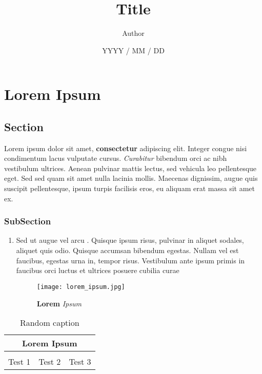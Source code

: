 \documentclass[12pt]{report}
\title{Title}
\author{Author}
\date{YYYY / MM / DD}
\begin{document}
	\maketitle
	\tableofcontents
	\chapter{Lorem Ipsum}

		\section{Section}

			Lorem ipsum dolor sit amet, \textbf{consectetur} adipiscing elit. Integer congue nisi condimentum lacus vulputate cursus. \textit{Curabitur} bibendum orci ac nibh vestibulum ultrices. Aenean pulvinar mattis lectus, sed vehicula leo pellentesque eget. Sed sed quam sit amet nulla lacinia mollis. Maecenas dignissim, augue quis suscipit pellentesque, ipsum turpis facilisis eros, eu aliquam erat massa sit amet ex.

			\subsection*{SubSection}

				\begin{enumerate}

					\item
					Sed ut augue vel arcu {\color{blue}{varius accumsan}}. Quisque ipsum risus, pulvinar in aliquet sodales, aliquet quis odio. Quisque accumsan bibendum egestas. Nullam vel est faucibus, egestas urna in, tempor risus. Vestibulum ante ipsum primis in faucibus orci luctus et ultrices posuere cubilia curae

					\begin{figure}[H]
						\centering
						\texttt{[image: lorem\_ipsum.jpg]}
						\caption{\textbf{Lorem} \textit{Ipsum}}
					\end{figure}

				\end{enumerate}

			\begin{table}[H]
				\centering
				\begin{tabular}{|c|c|c|}
					\hline
					\multicolumn{3}{|c|}{\textbf{Lorem Ipsum}} \\
					\hline
					{\color{red}{First}} & {\color{violet}{Second}} & {\color{teal}{Third}} \\
					\hline
					Test 1 & Test 2 & Test 3 \\
					\hline
				\end{tabular}
				\caption{Random caption}
			\end{table}
\end{document}
